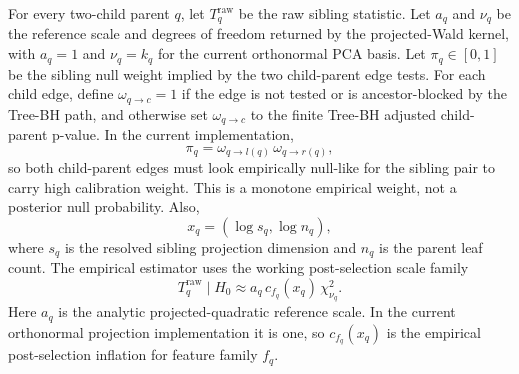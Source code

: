 For every two-child parent $q$, let $T_q^{\mathrm{raw}}$ be the raw sibling
statistic. Let $a_q$ and $\nu_q$ be the reference scale and degrees of freedom
returned by the projected-Wald kernel, with $a_q=1$ and $\nu_q=k_q$ for the
current orthonormal PCA basis. Let $\pi_q \in [0,1]$ be the sibling null weight
implied by the two child-parent edge tests. For each child edge, define
\(\omega_{q\to c}=1\) if the edge is not tested or is ancestor-blocked by the
Tree-BH path, and otherwise set \(\omega_{q\to c}\) to the finite Tree-BH
adjusted child-parent p-value. In the current implementation,
\begin{equation}
\pi_q =
\omega_{q\to l(q)}\,\omega_{q\to r(q)},
\end{equation}
so both child-parent edges must look empirically null-like for the sibling pair
to carry high calibration weight. This is a monotone empirical weight, not a
posterior null probability. Also,
\[
x_q = (\log s_q,\log n_q),
\]
where $s_q$ is the resolved sibling projection dimension and $n_q$ is the
parent leaf count. The empirical estimator uses the working post-selection scale family
\begin{equation}\label{eq:sibling-context-scale-model}
T_q^{\mathrm{raw}} \mid H_0
\approx
a_q\,c_{f_q}(x_q)\,\chi^2_{\nu_q}.
\end{equation}
Here $a_q$ is the analytic projected-quadratic reference scale. In the current
orthonormal projection implementation it is one, so $c_{f_q}(x_q)$ is the
empirical post-selection inflation for feature family $f_q$.

